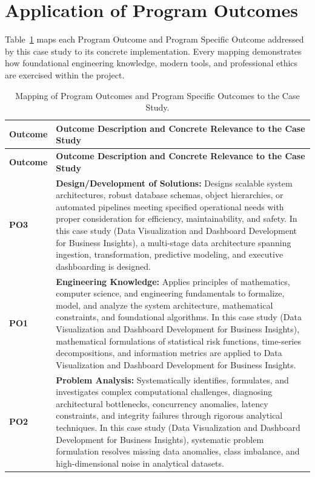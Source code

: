 \section{Application of Program Outcomes}
Table~\ref{tab:po} maps each Program Outcome and Program Specific Outcome addressed by this case study to its concrete implementation. Every mapping demonstrates how foundational engineering knowledge, modern tools, and professional ethics are exercised within the project.

{\small
\begin{longtable}{@{}>{\centering\arraybackslash}p{1.8cm} p{13.2cm}@{}}
    \caption{Mapping of Program Outcomes and Program Specific Outcomes to the Case Study.}\label{tab:po}\\
    \toprule
    \textbf{Outcome} & \textbf{Outcome Description and Concrete Relevance to the Case Study} \\
    \midrule
    \endfirsthead
    \toprule
    \textbf{Outcome} & \textbf{Outcome Description and Concrete Relevance to the Case Study} \\
    \midrule
    \endhead
\textbf{PO3} & \textbf{Design/Development of Solutions:} Designs scalable system architectures, robust database schemas, object hierarchies, or automated pipelines meeting specified operational needs with proper consideration for efficiency, maintainability, and safety. In this case study (Data Visualization and Dashboard Development for Business Insights), a multi-stage data architecture spanning ingestion, transformation, predictive modeling, and executive dashboarding is designed. \\
    \addlinespace
\textbf{PO1} & \textbf{Engineering Knowledge:} Applies principles of mathematics, computer science, and engineering fundamentals to formalize, model, and analyze the system architecture, mathematical constraints, and foundational algorithms. In this case study (Data Visualization and Dashboard Development for Business Insights), mathematical formulations of statistical risk functions, time-series decompositions, and information metrics are applied to Data Visualization and Dashboard Development for Business Insights. \\
    \addlinespace
\textbf{PO2} & \textbf{Problem Analysis:} Systematically identifies, formulates, and investigates complex computational challenges, diagnosing architectural bottlenecks, concurrency anomalies, latency constraints, and integrity failures through rigorous analytical techniques. In this case study (Data Visualization and Dashboard Development for Business Insights), systematic problem formulation resolves missing data anomalies, class imbalance, and high-dimensional noise in analytical datasets. \\

\end{longtable}}
